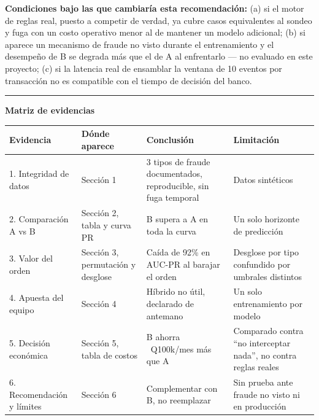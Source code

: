 \documentclass[10.5pt]{article}
\begin{document}
\textbf{Condiciones bajo las que cambiaría esta recomendación:} (a) si el motor de reglas real,
puesto a competir de verdad, ya cubre casos equivalentes al sondeo y fuga con un costo operativo
menor al de mantener un modelo adicional; (b) si aparece un mecanismo de fraude no visto durante el
entrenamiento y el desempeño de B se degrada más que el de A al enfrentarlo — no evaluado en este
proyecto; (c) si la latencia real de ensamblar la ventana de 10 eventos por transacción no es
compatible con el tiempo de decisión del banco.

\vspace{4pt}
\hrule
\vspace{4pt}
\small
\textbf{Matriz de evidencias}

\begin{tabular}{p{2.7cm}p{5.1cm}p{4.6cm}p{4.1cm}}
\toprule
Evidencia & Dónde aparece & Conclusión & Limitación \\
\midrule
1. Integridad de datos & Sección 1 & 3 tipos de fraude documentados, reproducible, sin fuga temporal & Datos sintéticos \\
2. Comparación A vs B & Sección 2, tabla y curva PR & B supera a A en toda la curva & Un solo horizonte de predicción \\
3. Valor del orden & Sección 3, permutación y desglose & Caída de 92\% en AUC-PR al barajar el orden & Desglose por tipo confundido por umbrales distintos \\
4. Apuesta del equipo & Sección 4 & Híbrido no útil, declarado de antemano & Un solo entrenamiento por modelo \\
5. Decisión económica & Sección 5, tabla de costos & B ahorra ~Q100k/mes más que A & Comparado contra ``no interceptar nada'', no contra reglas reales \\
6. Recomendación y límites & Sección 6 & Complementar con B, no reemplazar & Sin prueba ante fraude no visto ni en producción \\
\bottomrule
\end{tabular}
\end{document}
